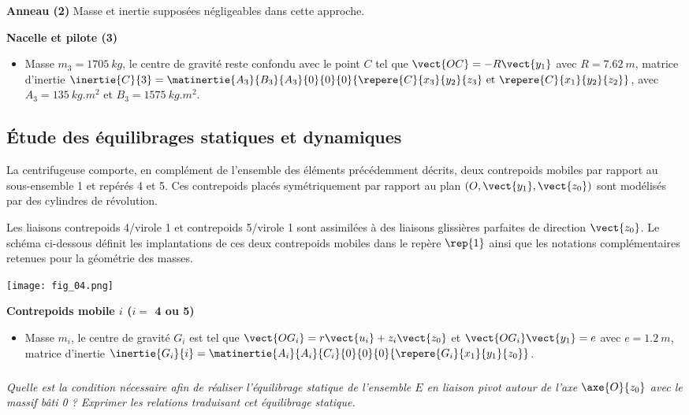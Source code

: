 \begin{multicols}{2}
\textbf{Anneau (2)}
Masse et inertie supposées négligeables dans cette approche.


\textbf{Nacelle et pilote (3)}
\begin{itemize}
\item Masse $m_3=\SI{1705}{kg}$, le centre de gravité  reste confondu avec le point $C$ tel que $\vect{OC}=-R\vect{y_1}$ avec ${R}=\SI{7,62}{m}$, matrice d'inertie $\inertie{C}{3}=\matinertie{A_3}{B_3}{A_3}{0}{0}{0}{\repere{C}{x_3}{y_2}{z_3}\text{ et } \repere{C}{x_1}{y_2}{z_2}}$, avec $A_3=\SI{135}{kg.m^2}$ et $B_3=\SI{1575}{kg.m^2}$.
\end{itemize}


\subsection*{Étude des équilibrages statiques et dynamiques}
La centrifugeuse comporte, en complément de l’ensemble des éléments précédemment décrits, deux
contrepoids mobiles par rapport au sous-ensemble 1 et repérés 4 et 5. Ces contrepoids placés symétriquement
par rapport au plan $\left( O,\vect{y_1},\vect{z_0}\right)$ sont modélisés par des cylindres de révolution.

Les liaisons contrepoids 4/virole 1 et contrepoids 5/virole 1 sont assimilées à des liaisons glissières parfaites
de direction $\vect{z_0}$. Le schéma ci-dessous définit les implantations de ces deux contrepoids mobiles dans le repère
$\rep{1}$ ainsi que les notations complémentaires retenues pour la géométrie des masses.

\begin{center}
\texttt{[image: fig\_04.png]}
\end{center}


\textbf{Contrepoids mobile $i$ ($i=$ 4 ou 5)}
\begin{itemize}
\item Masse $m_i$, le centre de gravité $G_i$ est tel que $\vect{OG_i}=r\vect{u_i}+z_i \vect{z_0}$ et $\vect{OG_i}\vect{y_1}=e$  avec ${e}=\SI{1,2}{m}$, matrice d'inertie $\inertie{G_i}{i}=\matinertie{A_i}{A_i}{C_i}{0}{0}{0}{\repere{G_i}{x_1}{y_1}{z_0}}$.
\end{itemize}



\subparagraph{}
\textit{Quelle est la condition nécessaire afin de réaliser l’équilibrage statique de l’ensemble
$E$ en liaison pivot autour de l’axe $\axe{O}{z_0}$ avec le massif bâti 0 ? Exprimer les relations
traduisant cet équilibrage statique.
}
\ifprof
\begin{corrige}
\end{corrige}\else\fi



\end{multicols}
